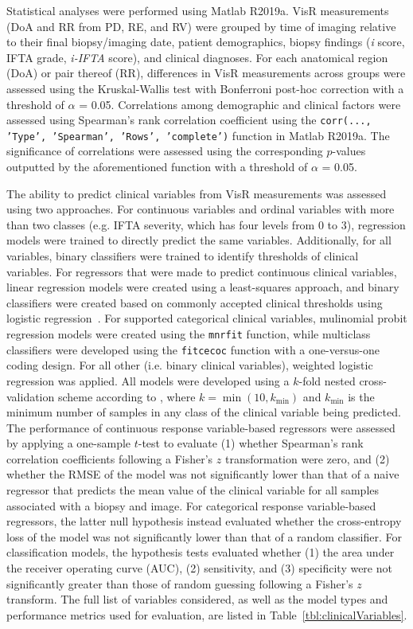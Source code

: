 Statistical analyses were performed using Matlab R2019a. VisR measurements (DoA and RR from PD, RE, and RV) were grouped by time of imaging relative to their final biopsy/imaging date, patient demographics, biopsy findings (\emph{i} score, IFTA grade, \emph{i-IFTA} score), and clinical diagnoses. For each anatomical region (DoA) or pair thereof (RR), differences in VisR measurements  across groups were assessed using the Kruskal-Wallis test with Bonferroni post-hoc correction with a threshold of $\alpha$ = 0.05. Correlations among demographic and clinical factors were assessed using Spearman's rank correlation coefficient using the \texttt{corr(..., 'Type', 'Spearman', 'Rows', 'complete')} function in Matlab R2019a. The significance of correlations were assessed using the corresponding $p$-values outputted by the aforementioned function with a threshold of $\alpha$ = 0.05.

The ability to predict clinical variables from VisR measurements was assessed using two approaches. For continuous variables and ordinal variables with more than two classes (e.g. IFTA severity, which has four levels from 0 to 3), regression models were trained to directly predict the same variables. Additionally, for all variables, binary classifiers were trained to identify thresholds of clinical variables. For regressors that were made to predict continuous clinical variables, linear regression models were created using a least-squares approach, and binary classifiers were created based on commonly accepted clinical thresholds using logistic regression~\cite{pagana_Creatinine_2021,bouchard_Estimating_2021,haider_Proteinuria_2025}. For supported categorical clinical variables, mulinomial probit regression models were created using the \texttt{mnrfit} function, while multiclass classifiers were developed using the \texttt{fitcecoc} function with a one-versus-one coding design. For all other (i.e. binary clinical variables), weighted logistic regression was applied. All models were developed using a $k$-fold nested cross-validation scheme according to \cite{varma_Bias_2006}, where $k = \min \left( 10, k_{\textrm{min}} \right)$ and $k_{\textrm{min}}$ is the minimum number of samples in any class of the clinical variable being predicted. The performance of continuous response variable-based regressors were assessed by applying a one-sample $t$-test to evaluate (1) whether Spearman's rank correlation coefficients following a Fisher's $z$ transformation were zero, and (2) whether the RMSE of the model was not significantly lower than that of a naive regressor that predicts the mean value of the clinical variable for all samples associated with a biopsy and image. For categorical response variable-based regressors, the latter null hypothesis instead evaluated whether the cross-entropy loss of the model was not significantly lower than that of a random classifier. For classification models, the hypothesis tests evaluated whether (1) the area under the receiver operating curve (AUC), (2) sensitivity, and (3) specificity were not significantly greater than those of random guessing following a Fisher's $z$ transform. The full list of variables considered, as well as the model types and performance metrics used for evaluation, are listed in Table~\ref{tbl:clinicalVariables}.


